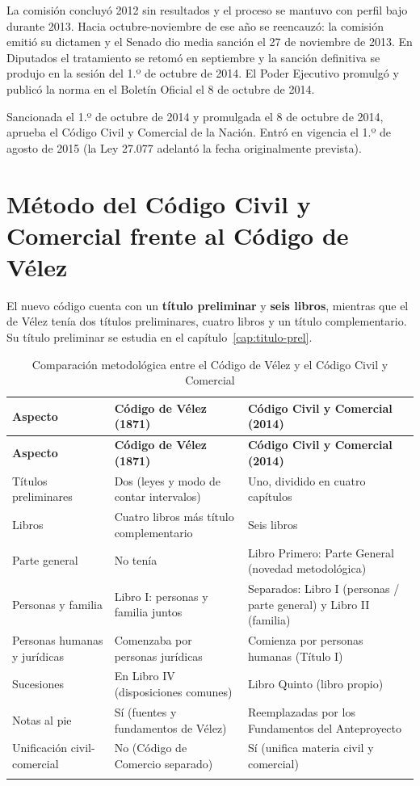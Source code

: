 \documentclass[12pt,oneside]{book}
\begin{document}
La comisión concluyó 2012 sin resultados y el proceso se mantuvo con perfil bajo durante 2013. Hacia octubre-noviembre de ese año se reencauzó: la comisión emitió su dictamen y el Senado dio media sanción el 27 de noviembre de 2013. En Diputados el tratamiento se retomó en septiembre y la sanción definitiva se produjo en la sesión del 1.º de octubre de 2014. El Poder Ejecutivo promulgó y publicó la norma en el Boletín Oficial el 8 de octubre de 2014.

\begin{importante}[Ley 26.994]
Sancionada el 1.º de octubre de 2014 y promulgada el 8 de octubre de 2014, aprueba el Código Civil y Comercial de la Nación. Entró en vigencia el 1.º de agosto de 2015 (la Ley 27.077 adelantó la fecha originalmente prevista).
\end{importante}

\section{Método del Código Civil y Comercial frente al Código de Vélez}

El nuevo código cuenta con un \textbf{título preliminar} y \textbf{seis libros}, mientras que el de Vélez tenía dos títulos preliminares, cuatro libros y un título complementario. Su título preliminar se estudia en el capítulo~\ref{cap:titulo-prel}.

\begin{longtable}{@{}B{0.20\textwidth}L{0.34\textwidth}L{0.34\textwidth}@{}}
\toprule
\textbf{Aspecto} & \textbf{Código de Vélez (1871)} & \textbf{Código Civil y Comercial (2014)} \\
\midrule
\endfirsthead
\toprule
\textbf{Aspecto} & \textbf{Código de Vélez (1871)} & \textbf{Código Civil y Comercial (2014)} \\
\midrule
\endhead
\bottomrule
\endfoot
Títulos preliminares & Dos (leyes y modo de contar intervalos) & Uno, dividido en cuatro capítulos \\
Libros & Cuatro libros más título complementario & Seis libros \\
Parte general & No tenía & Libro Primero: Parte General (novedad metodológica) \\
Personas y familia & Libro I: personas y familia juntos & Separados: Libro I (personas / parte general) y Libro II (familia) \\
Personas humanas y jurídicas & Comenzaba por personas jurídicas & Comienza por personas humanas (Título I) \\
Sucesiones & En Libro IV (disposiciones comunes) & Libro Quinto (libro propio) \\
Notas al pie & Sí (fuentes y fundamentos de Vélez) & Reemplazadas por los Fundamentos del Anteproyecto \\
Unificación civil-comercial & No (Código de Comercio separado) & Sí (unifica materia civil y comercial) \\
\caption{Comparación metodológica entre el Código de Vélez y el Código Civil y Comercial}\\
\end{longtable}
\end{document}
